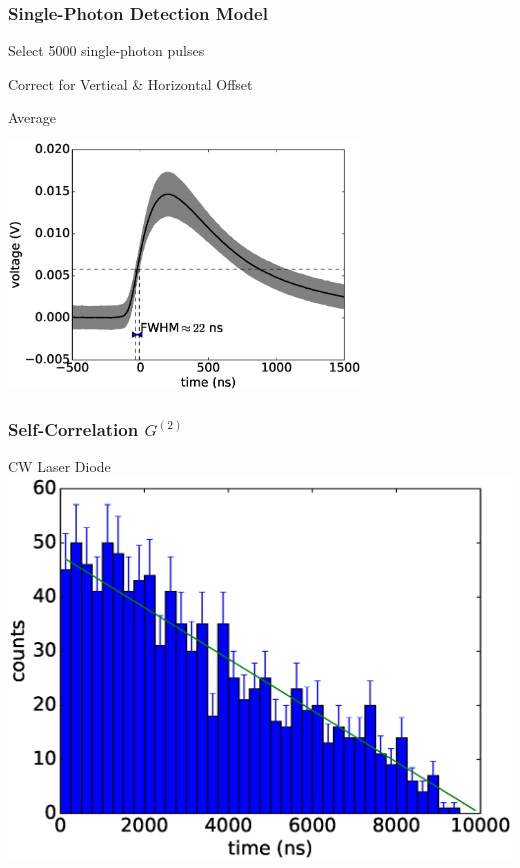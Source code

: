 \begin{frame}\frametitle{Single-Photon Detection Model}
  \begin{center}
      \begin{itemize}
      \begin{center}
        \item Select 5000 single-photon pulses
        \item Correct for Vertical \& Horizontal Offset
        \item Average
      \end{center}
      \end{itemize}
    \includegraphics[width=0.7\textwidth]{images/intrinsic_jitter/jitter.eps}
    \end{center}
\end{frame}

\begin{frame}\frametitle{Self-Correlation $G^{(2)}$}
  \begin{center}
  CW Laser Diode
    \includegraphics[width=\textwidth]{images/g2_cw_source/g2_cw_binsize_250ns.eps}
    \end{center}
\end{frame}

